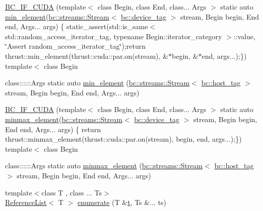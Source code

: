 \begin{DoxyCompactItemize}
\item 
\hyperlink{namespacebc_1_1algorithms_aa283dc889b39fdce83ca44ad0f5f411f}{B\+C\+\_\+\+I\+F\+\_\+\+C\+U\+DA} (template$<$ class Begin, class End, class... Args $>$ static auto \hyperlink{namespacebc_1_1algorithms_a79de57ecdb13600a50218db36c1e8102}{min\+\_\+element}(\hyperlink{classbc_1_1streams_1_1Stream}{bc\+::streams\+::\+Stream}$<$ \hyperlink{structbc_1_1device__tag}{bc\+::device\+\_\+tag} $>$ stream, Begin begin, End end, Args... args) \{ static\+\_\+assert(std\+::is\+\_\+same$<$ std\+::random\+\_\+access\+\_\+iterator\+\_\+tag, typename Begin\+::iterator\+\_\+category $>$\+::value, \char`\"{}Assert random\+\_\+access\+\_\+iterator\+\_\+tag\char`\"{});return thrust\+::min\+\_\+element(thrust\+::cuda\+::par.\+on(stream), \&$\ast$begin, \&$\ast$end, args...);\}) template$<$ class Begin
\item 
class\+::::::\+Args static auto \hyperlink{namespacebc_1_1algorithms_a79de57ecdb13600a50218db36c1e8102}{min\+\_\+element} (\hyperlink{classbc_1_1streams_1_1Stream}{bc\+::streams\+::\+Stream}$<$ \hyperlink{structbc_1_1host__tag}{bc\+::host\+\_\+tag} $>$ stream, Begin begin, End end, Args... args)
\item 
\hyperlink{namespacebc_1_1algorithms_abc8e0fa774625ec682265e98e18b5283}{B\+C\+\_\+\+I\+F\+\_\+\+C\+U\+DA} (template$<$ class Begin, class End, class... Args $>$ static auto \hyperlink{namespacebc_1_1algorithms_afce1a4f97716bc7f382dd42dade0f257}{minmax\+\_\+element}(\hyperlink{classbc_1_1streams_1_1Stream}{bc\+::streams\+::\+Stream}$<$ \hyperlink{structbc_1_1device__tag}{bc\+::device\+\_\+tag} $>$ stream, Begin begin, End end, Args... args) \{ return thrust\+::minmax\+\_\+element(thrust\+::cuda\+::par.\+on(stream), begin, end, args...);\}) template$<$ class Begin
\item 
class\+::::::\+Args static auto \hyperlink{namespacebc_1_1algorithms_afce1a4f97716bc7f382dd42dade0f257}{minmax\+\_\+element} (\hyperlink{classbc_1_1streams_1_1Stream}{bc\+::streams\+::\+Stream}$<$ \hyperlink{structbc_1_1host__tag}{bc\+::host\+\_\+tag} $>$ stream, Begin begin, End end, Args... args)
\item 
{\footnotesize template$<$class T , class ... Ts$>$ }\\\hyperlink{structbc_1_1algorithms_1_1ReferenceList}{Reference\+List}$<$ T $>$ \hyperlink{namespacebc_1_1algorithms_a2f08ba7db0b64c608580cefecd06be6a}{enumerate} (T \&\hyperlink{expression__operations_8h_aaf23b70530701962855e4abdeea019a2}{t}, Ts \&... ts)
\end{DoxyCompactItemize}


